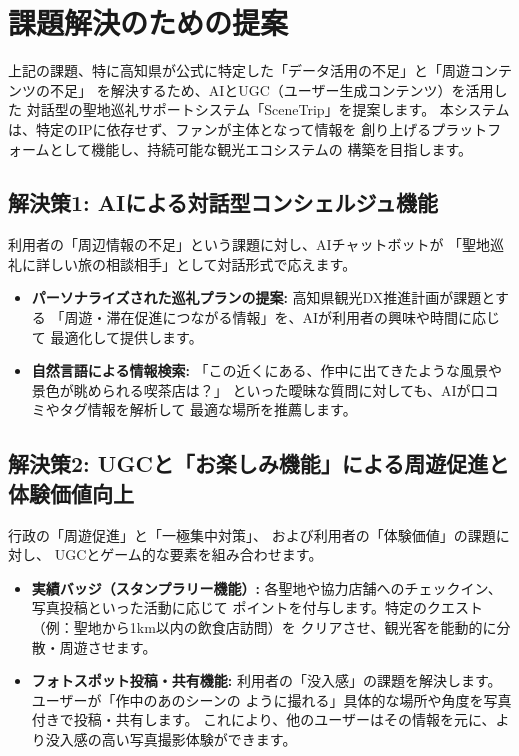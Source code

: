 \documentclass{docs}
\begin{document}
\section{課題解決のための提案}
上記の課題、特に高知県が公式に特定した「データ活用の不足」と「周遊コンテンツの不足」\cite{kochi_dx_plan}
を解決するため、AIとUGC（ユーザー生成コンテンツ）を活用した
対話型の聖地巡礼サポートシステム「SceneTrip」を提案します。
本システムは、特定のIPに依存せず、ファンが主体となって情報を
創り上げるプラットフォームとして機能し、持続可能な観光エコシステムの
構築を目指します。

\subsection{解決策1: AIによる対話型コンシェルジュ機能}
利用者の「周辺情報の不足」という課題に対し、AIチャットボットが
「聖地巡礼に詳しい旅の相談相手」として対話形式で応えます。
\begin{itemize}
    \item \textbf{パーソナライズされた巡礼プランの提案:}
    高知県観光DX推進計画\cite{kochi_dx_plan}が課題とする
    「周遊・滞在促進につながる情報」を、AIが利用者の興味や時間に応じて
    最適化して提供します。
    \item \textbf{自然言語による情報検索:}
    「この近くにある、作中に出てきたような風景や景色が眺められる喫茶店は？」
	といった曖昧な質問に対しても、AIが口コミやタグ情報を解析して
    最適な場所を推薦します。
\end{itemize}

\subsection{解決策2: UGCと「お楽しみ機能」による周遊促進と体験価値向上}
行政の「周遊促進」\cite{kochi_r7_plan}と「一極集中対策」\cite{jalan_overtourism, kanko_overtourism}、
および利用者の「体験価値」\cite{toppan2025}の課題に対し、
UGCとゲーム的な要素を組み合わせます。
\begin{itemize}
    \item \textbf{実績バッジ（スタンプラリー機能）:}
    各聖地や協力店舗へのチェックイン、写真投稿といった活動に応じて
    ポイントを付与します。特定のクエスト（例：聖地から1km以内の飲食店訪問）を
    クリアさせ、観光客を能動的に分散・周遊させます。
    \item \textbf{フォトスポット投稿・共有機能:}
    利用者の「没入感」の課題を解決します。ユーザーが「作中のあのシーンの
    ように撮れる」具体的な場所や角度を写真付きで投稿・共有します。
    これにより、他のユーザーはその情報を元に、より没入感の高い写真撮影体験ができます。
\end{itemize}
\end{document}
